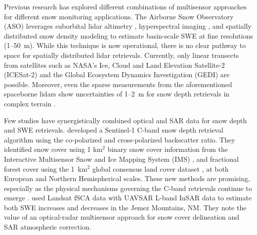 Previous research has explored different combinations of multisensor approaches for different snow monitoring applications. The Airborne Snow Observatory (ASO) \citep{painterAirborneSnowObservatory2016} leverages suborbital lidar altimetry \citep{deemsLidarMeasurementSnow2013}, hyperspectral imaging \citep{nolinMappingAlpineSnow1993}, and spatially distributed snow density modeling \citep{marksSpatiallyDistributedEnergy1999,hedrickDirectInsertionNASA2018,meyerOperationalWaterForecast2023a} to estimate basin-scale SWE at fine resolutions (1--50~m). While this technique is now operational, there is no clear pathway to space for spatially distributed lidar retrievals. Currently, only linear transects from satellites such as NASA's Ice, Cloud and Land Elevation Satellite-2 (ICESat-2) \citep{abdalatiICESat2LaserAltimetry2010} and the Global Ecosystem Dynamics Investigation (GEDI) \citep{dubayahGlobalEcosystemDynamics2020} are possible. Moreover, even the sparse measurements from the aforementioned spaceborne lidars show uncertainties of 1--2~m for snow depth retrievals in complex terrain \citep{enderlinUncertaintyICESat2ATL062022, deschamps-bergerEvaluationSnowDepth2022}. 


Few studies have synergistically combined optical and SAR data for snow depth and SWE retrievals. \cite{lievensSnowDepthVariability2019,lievensSentinel1SnowDepth2022} developed a Sentinel-1 C-band snow depth retrieval algorithm using the co-polarized and cross-polarized backscatter ratio. They identified snow cover using 1 km$^{2}$ binary snow cover information from the Interactive Multisensor Snow and Ice Mapping System (IMS) \citep{u.s.nationalicecenterIMSDailyNorthern2008, ramsayInteractiveMultisensorSnow1998, helfrichEnhancementsForthcomingDevelopments2007}, and fractional forest cover using the 1~km$^{2}$ global consensus land cover dataset \citep{tuanmuGlobal1kmConsensus2014}, at both European and Northern Hemispherical scales. These new methods are promising, especially as the physical mechanisms governing the C-band retrievals continue to emerge \citep{zhuModelingScatteringDense2023}. \cite{tarriconeEstimatingSnowAccumulation2023a} used Landsat fSCA data with UAVSAR \citep{hensleyUAVSARInstrumentDescription2008} L-band InSAR data to estimate both SWE increases and decreases in the Jemez Mountains, NM. They note the value of an optical-radar multisensor approach for snow cover delineation and SAR atmospheric correction. 

